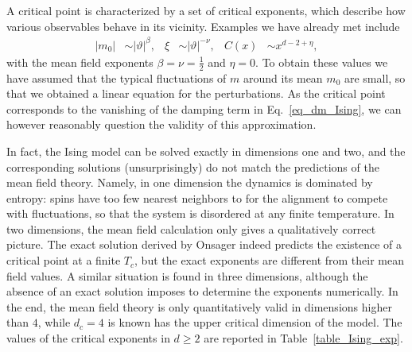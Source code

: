 A critical point is characterized by a set of critical exponents, which describe how various observables behave in its vicinity.
Examples we have already met include
%
\begin{align}
    |m_0| &\sim |\vartheta|^\beta, &
    \xi & \sim |\vartheta|^{-\nu}, &
    C(x) & \sim x^{d - 2 + \eta},
\end{align}
%
with the mean field exponents $\beta = \nu = \tfrac{1}{2}$ and $\eta = 0$.
To obtain these values we have assumed that the typical fluctuations of $m$ around its mean $m_0$ are small, so that we obtained a linear equation for the perturbations.
As the critical point corresponds to the vanishing of the damping term in Eq.~\eqref{eq_dm_Ising}, 
we can however reasonably question the validity of this approximation.

In fact, the Ising model can be solved exactly in dimensions one and two, 
and the corresponding solutions (unsurprisingly) do not match the predictions of the mean field theory.
Namely, in one dimension the dynamics is dominated by entropy: spins have too few nearest neighbors to for the alignment to compete with fluctuations, so that the system is disordered at any finite temperature.
In two dimensions, the mean field calculation only gives a qualitatively correct picture. 
The exact solution derived by Onsager indeed predicts the existence of a critical point at a finite $T_c$, but the exact exponents are different from their mean field values.  
A similar situation is found in three dimensions, although the absence of an exact solution imposes to determine the exponents numerically.
In the end, the mean field theory is only quantitatively valid in dimensions higher than $4$, while $d_c = 4$ is known has the upper critical dimension of the model.
The values of the critical exponents in $d \ge 2$ are reported in Table~\ref{table_Ising_exp}.

